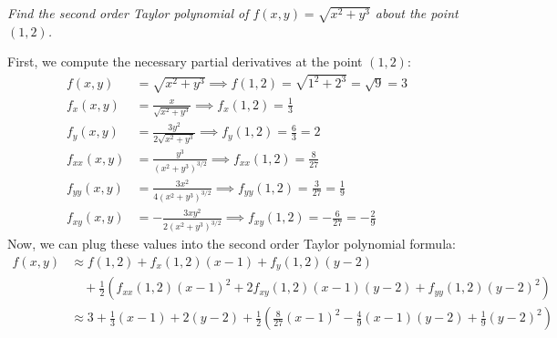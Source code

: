 \documentclass[11pt]{report}
\begin{document}
\begin{example}
    \textit{Find the second order Taylor polynomial of $f(x,y) = \sqrt{x^2 + y^3}$ about the point $(1,2)$.}
    
    First, we compute the necessary partial derivatives at the point $(1,2)$:
    \begin{align*}
        f(x,y) &= \sqrt{x^2 + y^3} \implies f(1,2) = \sqrt{1^2 + 2^3} = \sqrt{9} = 3 \\
        f_x(x,y) &= \frac{x}{\sqrt{x^2 + y^3}} \implies f_x(1,2) = \frac{1}{3} \\
        f_y(x,y) &= \frac{3y^2}{2\sqrt{x^2 + y^3}} \implies f_y(1,2) = \frac{6}{3} = 2 \\
        f_{xx}(x,y) &= \frac{y^3}{(x^2 + y^3)^{3/2}} \implies f_{xx}(1,2) = \frac{8}{27} \\
        f_{yy}(x,y) &= \frac{3x^2}{4(x^2 + y^3)^{3/2}} \implies f_{yy}(1,2) = \frac{3}{27} = \frac{1}{9} \\
        f_{xy}(x,y) &= -\frac{3xy^2}{2(x^2 + y^3)^{3/2}} \implies f_{xy}(1,2) = -\frac{6}{27} = -\frac{2}{9}
    \end{align*}
    Now, we can plug these values into the second order Taylor polynomial formula:
    \begin{align*}
        f(x,y) &\approx f(1,2) + f_x(1,2)(x-1) + f_y(1,2)(y-2) \\
        &\quad + \frac{1}{2} \left( f_{xx}(1,2)(x-1)^2 + 2f_{xy}(1,2)(x-1)(y-2) + f_{yy}(1,2)(y-2)^2 \right) \\
        &\approx 3 + \frac{1}{3}(x-1) + 2(y-2) + \frac{1}{2} \left( \frac{8}{27}(x-1)^2 - \frac{4}{9}(x-1)(y-2) + \frac{1}{9}(y-2)^2 \right)
    \end{align*}
\end{example}
\end{document}
